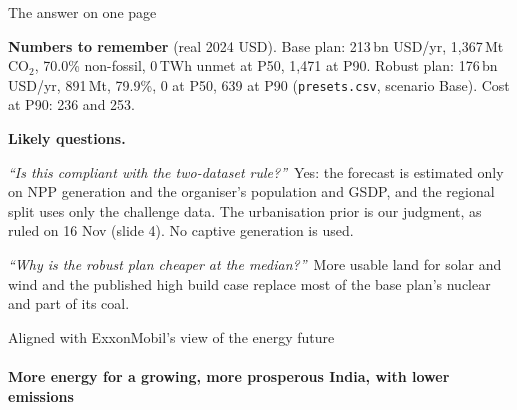 \documentclass[aspectratio=169,10pt,t]{beamer}
\newcommand{\qa}[2]{\emph{``#1''}\ #2\par\smallskip}
\begin{document}
\begin{frame}[label=s2]{The answer on one page}
{\textbf{Numbers to remember} (real 2024 USD). Base plan: 213\,bn USD/yr, 1,367\,Mt CO$_2$, 70.0\% non-fossil, 0\,TWh unmet at P50, 1,471 at P90. Robust plan: 176\,bn USD/yr, 891\,Mt, 79.9\%, 0 at P50, 639 at P90 (\texttt{presets.csv}, scenario Base). Cost at P90: 236 and 253.\par\medskip
\textbf{Likely questions.}\par
\qa{Is this compliant with the two-dataset rule?}{Yes: the forecast is estimated only on NPP generation and the organiser's population and GSDP, and the regional split uses only the challenge data. The urbanisation prior is our judgment, as ruled on 16 Nov (slide 4). No captive generation is used.}
\qa{Why is the robust plan cheaper at the median?}{More usable land for solar and wind and the published high build case replace most of the base plan's nuclear and part of its coal.}}
\end{frame}

\begin{frame}[label=s3]{Aligned with ExxonMobil's view of the energy future}
\framesubtitle{More energy for a growing, more prosperous India, with lower emissions}

\end{frame}
\end{document}

